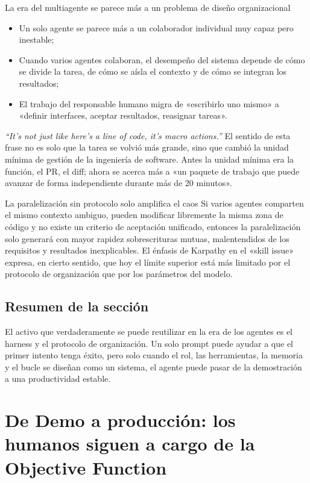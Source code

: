 \documentclass[a4paper]{article}
\begin{document}
\begin{knowledgebox}{La era del multiagente se parece más a un problema de diseño organizacional}
\begin{itemize}
    \item Un solo agente se parece más a un colaborador individual muy capaz pero inestable;
    \item Cuando varios agentes colaboran, el desempeño del sistema depende de cómo se divide la tarea, de cómo se aísla el contexto y de cómo se integran los resultados;
    \item El trabajo del responsable humano migra de «escribirlo uno mismo» a «definir interfaces, aceptar resultados, reasignar tareas».
\end{itemize}
\end{knowledgebox}

\textit{``It's not just like here's a line of code, it's macro actions.''} El sentido de esta frase no es solo que la tarea se volvió más grande, sino que cambió la unidad mínima de gestión de la ingeniería de software. Antes la unidad mínima era la función, el PR, el diff; ahora se acerca más a «un paquete de trabajo que puede avanzar de forma independiente durante más de 20 minutos».

\begin{warningbox}{La paralelización sin protocolo solo amplifica el caos}
Si varios agentes comparten el mismo contexto ambiguo, pueden modificar libremente la misma zona de código y no existe un criterio de aceptación unificado, entonces la paralelización solo generará con mayor rapidez sobrescrituras mutuas, malentendidos de los requisitos y resultados inexplicables. El énfasis de Karpathy en el «skill issue» expresa, en cierto sentido, que hoy el límite superior está más limitado por el protocolo de organización que por los parámetros del modelo.
\end{warningbox}

\subsection{Resumen de la sección}
El activo que verdaderamente se puede reutilizar en la era de los agentes es el harness y el protocolo de organización. Un solo prompt puede ayudar a que el primer intento tenga éxito, pero solo cuando el rol, las herramientas, la memoria y el bucle se diseñan como un sistema, el agente puede pasar de la demostración a una productividad estable.

\section{De Demo a producción: los humanos siguen a cargo de la Objective Function}
\end{document}
